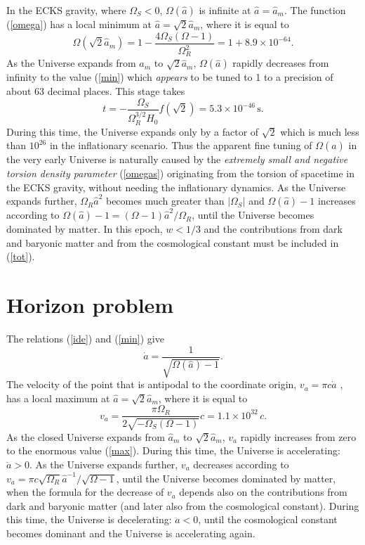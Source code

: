\documentclass[prd,onecolumn,nofootinbib,showkeys]{revtex4}
\begin{document}
In the ECKS gravity, where $\Omega_S<0$, $\Omega(\hat{a})$ is infinite at $\hat{a}=\hat{a}_m$.
The function (\ref{omega}) has a local minimum at $\hat{a}=\sqrt{2}\hat{a}_m$, where it is equal to
\begin{equation}
\Omega(\sqrt{2}\hat{a}_m)=1-\frac{4\Omega_S(\Omega-1)}{\Omega^2_R}=1+8.9\times10^{-64}.
\label{min}
\end{equation}
As the Universe expands from $\hat{a}_m$ to $\sqrt{2}\hat{a}_m$, $\Omega(\hat{a})$ rapidly decreases from infinity to the value (\ref{min}) which {\em appears} to be tuned to 1 to a precision of about 63 decimal places.
This stage takes
\begin{equation}
t=-\frac{\Omega_S}{\Omega^{3/2}_R H_0}f(\sqrt{2})=5.3\times10^{-46}\,\mbox{s}.
\label{time}
\end{equation}
During this time, the Universe expands only by a factor of $\sqrt{2}$ which is much less than $10^{26}$ in the inflationary scenario.
Thus the apparent fine tuning of $\Omega(\hat{a})$ in the very early Universe is naturally caused by the {\em extremely small and negative torsion density parameter} (\ref{omegas}) originating from the torsion of spacetime in the ECKS gravity, without needing the inflationary dynamics.
As the Universe expands further, $\Omega_R\hat{a}^2$ becomes much greater than $|\Omega_S|$ and $\Omega(\hat{a})-1$ increases according to $\Omega(\hat{a})-1=(\Omega-1)\hat{a}^2/\Omega_R$, until the Universe becomes dominated by matter.
In this epoch, $w<1/3$ and the contributions from dark and baryonic matter and from the cosmological constant must be included in (\ref{tot}).

\section{Horizon problem}
The relations (\ref{ide}) and (\ref{min}) give
\begin{equation}
\dot{a}=\frac{1}{\sqrt{\Omega(\hat{a})-1}}.
\end{equation}
The velocity of the point that is antipodal to the coordinate origin, $v_a=\pi c\dot{a}$ \cite{LL,Ric}, has a local maximum at $\hat{a}=\sqrt{2}\hat{a}_m$, where it is equal to
\begin{equation}
v_a=\frac{\pi\Omega_R}{2\sqrt{-\Omega_S(\Omega-1)}}c=1.1\times10^{32}\,c.
\label{max}
\end{equation}
As the closed Universe expands from $\hat{a}_m$ to $\sqrt{2}\hat{a}_m$, $v_a$ rapidly increases from zero to the enormous value (\ref{max}).
During this time, the Universe is accelerating: $\ddot{a}>0$.
As the Universe expands further, $v_a$ decreases according to $v_a=\pi c\sqrt{\Omega_R}\hat{a}^{-1}/\sqrt{\Omega-1}$, until the Universe becomes dominated by matter, when the formula for the decrease of $v_a$ depends also on the contributions from dark and baryonic matter (and later also from the cosmological constant).
During this time, the Universe is decelerating: $\ddot{a}<0$, until the cosmological constant becomes dominant and the Universe is accelerating again.
\end{document}
